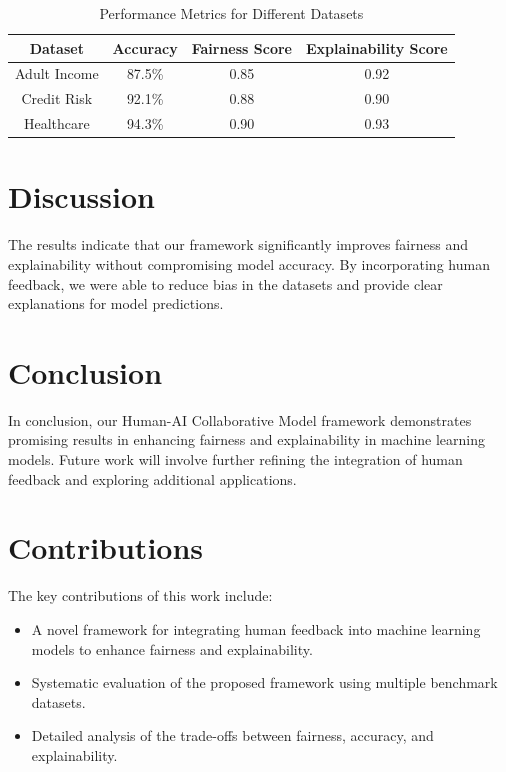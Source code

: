 \documentclass{article}
\begin{document}
\begin{table}[ht]
\centering
\begin{tabular}{|c|c|c|c|}
\hline
Dataset & Accuracy & Fairness Score & Explainability Score \\
\hline
Adult Income & 87.5\% & 0.85 & 0.92 \\
\hline
Credit Risk & 92.1\% & 0.88 & 0.90 \\
\hline
Healthcare & 94.3\% & 0.90 & 0.93 \\
\hline
\end{tabular}
\caption{Performance Metrics for Different Datasets}
\label{tab:results}
\end{table}

\section{Discussion}
The results indicate that our framework significantly improves fairness and explainability without compromising model accuracy. By incorporating human feedback, we were able to reduce bias in the datasets and provide clear explanations for model predictions.

\section{Conclusion}
In conclusion, our Human-AI Collaborative Model framework demonstrates promising results in enhancing fairness and explainability in machine learning models. Future work will involve further refining the integration of human feedback and exploring additional applications.

\section{Contributions}
The key contributions of this work include:
\begin{itemize}
    \item A novel framework for integrating human feedback into machine learning models to enhance fairness and explainability.
    \item Systematic evaluation of the proposed framework using multiple benchmark datasets.
    \item Detailed analysis of the trade-offs between fairness, accuracy, and explainability.
\end{itemize}
\end{document}
